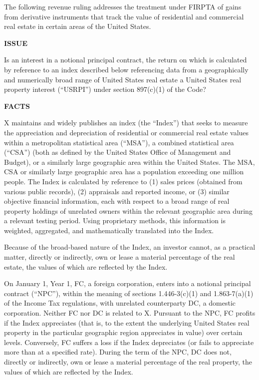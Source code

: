 The following revenue ruling addresses the treatment under FIRPTA of gains from derivative instruments that track the value of residential and commercial real estate in certain areas of the United States.  

\begin{select}

\begin{center} \textbf{ISSUE}
\end{center}  
Is an interest in a notional principal contract, the return on which is calculated by 
reference to an index described below referencing data from a geographically and 
numerically broad range of United States real estate a United States real property 
interest (``USRPI'') under section 897(c)(1) of the Code?  
\begin{center} \textbf{FACTS}
\end{center} 
X maintains and widely publishes an index (the ``Index'') that seeks to measure 
the appreciation and depreciation of residential or commercial real estate values within 
a metropolitan statistical area (``MSA''), a combined statistical area (``CSA'') (both as 
defined by the United States Office of Management and Budget), or a similarly large 
geographic area within the United States. The MSA, CSA or similarly large geographic 
area has a population exceeding one million people. The Index is calculated by 
reference to (1) sales prices (obtained from various public records), (2) appraisals and 
reported income, or (3) similar objective financial information, each with respect to a 
broad range of real property holdings of unrelated owners within the relevant geographic area during a relevant testing period.  Using proprietary methods, this information is weighted, aggregated, and mathematically translated into the Index.  

Because of the broad-based nature of the Index, an investor cannot, as a 
practical matter, directly or indirectly, own or lease a material percentage of the real 
estate, the values of which are reflected by the Index. 

On January 1, Year 1, FC, a foreign corporation, enters into a notional principal 
contract (``NPC''), within the meaning of sections 1.446-3(c)(1) and 1.863-7(a)(1) of the 
Income Tax regulations, with unrelated counterparty DC, a domestic corporation. 
Neither FC nor DC is related to X. Pursuant to the NPC, FC profits if the Index 
appreciates (that is, to the extent the underlying United States real property in the 
particular geographic region appreciates in value) over certain levels. Conversely, FC 
suffers a loss if the Index depreciates (or fails to appreciate more than at a specified 
rate). During the term of the NPC, DC does not, directly or indirectly, own or lease a 
material percentage of the real property, the values of which are reflected by the Index.  


\end{select}
